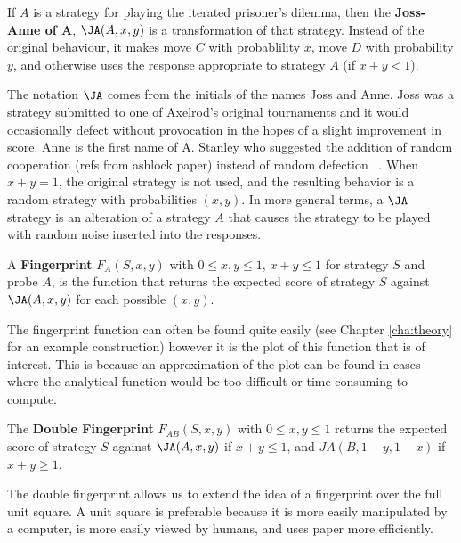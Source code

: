 \begin{definition}\label{def:joss-ann}
If $A$ is a strategy for playing the iterated prisoner's dilemma, then the \textbf{Joss-Anne of A}, $\JA(A, x, y)$ is a transformation of that strategy.
Instead of the original behaviour, it makes move $C$ with probablility $x$, move $D$ with probability $y$, and otherwise uses the response appropriate to strategy $A$ (if $x+y < 1$).
\end{definition}

The notation $\JA$ comes from the initials of the names Joss and Anne.
Joss was a strategy submitted to one of Axelrod’s original tournaments and it would occasionally defect without provocation in the hopes of a slight improvement in score.
Anne is the first name of A. Stanley who suggested the addition of random cooperation (refs from ashlock paper) instead of random defection ~\cite{Ashlock2008}.
When $x + y = 1$, the original strategy is not used, and the resulting behavior is a random strategy with probabilities $(x, y)$.
In more general terms, a $\JA$ strategy is an alteration of a strategy $A$ that causes the strategy to be played with random noise inserted into the responses.

\begin{definition}\label{def:fingerprint}
A \textbf{Fingerprint} $F_A(S, x, y)$ with $0 \leq x, y \leq 1$, $x+y \leq 1$ for strategy $S$ and probe $A$, is the function that returns the expected score of strategy $S$ against $\JA(A, x, y)$ for each possible $(x, y)$.
\end{definition}

The fingerprint function can often be found quite easily (see Chapter \ref{cha:theory} for an example construction) however it is the plot of this function that is of interest.
This is because an approximation of the plot can be found in cases where the analytical function would be too difficult or time consuming to compute.

\begin{definition}\label{def:double-fingerprint}
The \textbf{Double Fingerprint} $F_{AB}(S, x, y)$ with $0 \leq x, y \leq 1$ returns the expected score of strategy $S$ against $\JA(A, x, y)$ if $x+y \leq 1$, and $JA(B, 1-y, 1-x)$ if $x+y \geq 1$.
\end{definition}

The double fingerprint allows us to extend the idea of a fingerprint over the full unit square.
A unit square is preferable because it is more easily manipulated by a computer, is more easily viewed by humans, and uses paper more efficiently. %


